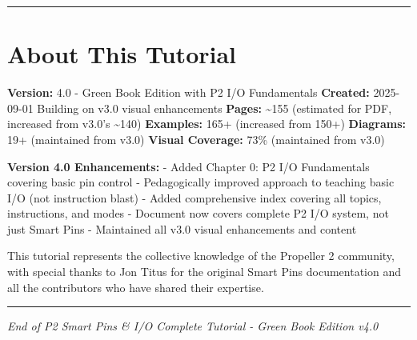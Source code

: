 \documentclass[11pt,a4paper,oneside,english]{book}
\begin{document}
\begin{center}\rule{0.5\linewidth}{0.5pt}\end{center}

\clearpage

\hypertarget{about-this-tutorial-1}{%
\chapter{About This Tutorial}\label{about-this-tutorial-1}}

\textbf{Version:} 4.0 - Green Book Edition with P2 I/O Fundamentals
\textbf{Created:} 2025-09-01 \textbar{} Building on v3.0 visual
enhancements \textbf{Pages:} \textasciitilde155 (estimated for PDF,
increased from v3.0's \textasciitilde140) \textbf{Examples:} 165+
(increased from 150+) \textbf{Diagrams:} 19+ (maintained from v3.0)
\textbf{Visual Coverage:} 73\% (maintained from v3.0)

\textbf{Version 4.0 Enhancements:} - Added Chapter 0: P2 I/O
Fundamentals covering basic pin control - Pedagogically improved
approach to teaching basic I/O (not instruction blast) - Added
comprehensive index covering all topics, instructions, and modes -
Document now covers complete P2 I/O system, not just Smart Pins -
Maintained all v3.0 visual enhancements and content

This tutorial represents the collective knowledge of the Propeller 2
community, with special thanks to Jon Titus for the original Smart Pins
documentation and all the contributors who have shared their expertise.

\begin{center}\rule{0.5\linewidth}{0.5pt}\end{center}

\emph{End of P2 Smart Pins \& I/O Complete Tutorial - Green Book Edition
v4.0}
\end{document}
